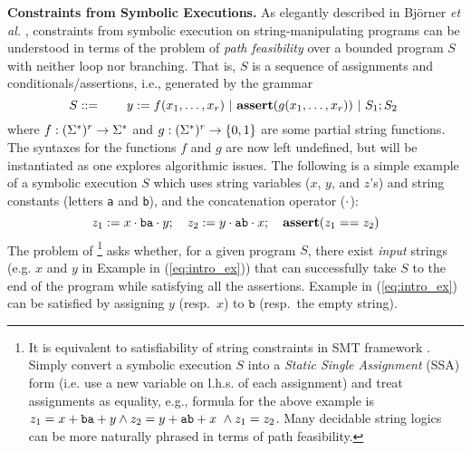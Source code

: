 \smallskip
\noindent
\textbf{Constraints from Symbolic Executions. }
As elegantly described in Bj\"{o}rner \emph{et al.} \cite{BTV09}, constraints 
from symbolic 
execution on string-manipulating programs can be understood in terms of the
problem of \emph{path 
feasibility} over a bounded program $S$ with neither loop nor
branching. %
That is, $S$ is a sequence of assignments and conditionals/assertions, i.e., 
generated by the grammar
\begin{equation} 
    S ::= \qquad y := f(x_1,\ldots,x_\arity) \ |\
    \text{\ASSERT{$g(x_1,\ldots,x_\arity)$}}\ |\ 
            S_1; S_2\ 
            \label{eq:symbex}
\end{equation}
where $f: (\Sigma^*)^r \to \Sigma^*$ and $g: (\Sigma^*)^r \to \{0,1\}$ are
some partial string functions. 
The syntaxes for the functions $f$ and $g$ are now
left undefined, but will be instantiated as one explores algorithmic issues.
The following is a simple example of a symbolic execution $S$
which uses string variables ($x$, $y$, and $z$'s) and string constants
(letters \texttt{a} and \texttt{b}), and the concatenation operator ($\cdot$):
\begin{equation}
        z_1 := x \cdot \text{\texttt{ba}} \cdot y;\quad 
        z_2 := y \cdot \text{\texttt{ab}} \cdot x;\quad
        \textbf{assert}(z_1 == z_2)
        \label{eq:intro_ex}
\end{equation}
The problem of \footnote{
    It is equivalent to 
satisfiability of string constraints in SMT framework
\cite{SMT-CACM,SMT-chapter,KS08}.
Simply convert a symbolic execution $S$ 
into a \emph{Static Single Assignment} (SSA) form (i.e. use a new 
variable 
on l.h.s. of each assignment) and treat assignments as equality,
e.g., formula for the above example is
        $z_1 = x + \text{\texttt{ba}} + y \wedge
        z_2 = y + \text{\texttt{ab}} + x\ \wedge
        z_1 = z_2$.
Many decidable string logics can be more naturally phrased in terms of
path feasibility.}
asks whether, for a given program $S$, there exist \emph{input} strings (e.g.
$x$ and $y$ in Example in (\ref{eq:intro_ex}))
that can successfully take
$S$ to the end of the program while satisfying all the assertions. 
Example in (\ref{eq:intro_ex}) can be satisfied by
assigning $y$ (resp.~$x$) to $\texttt{b}$ (resp.~the empty string). 


